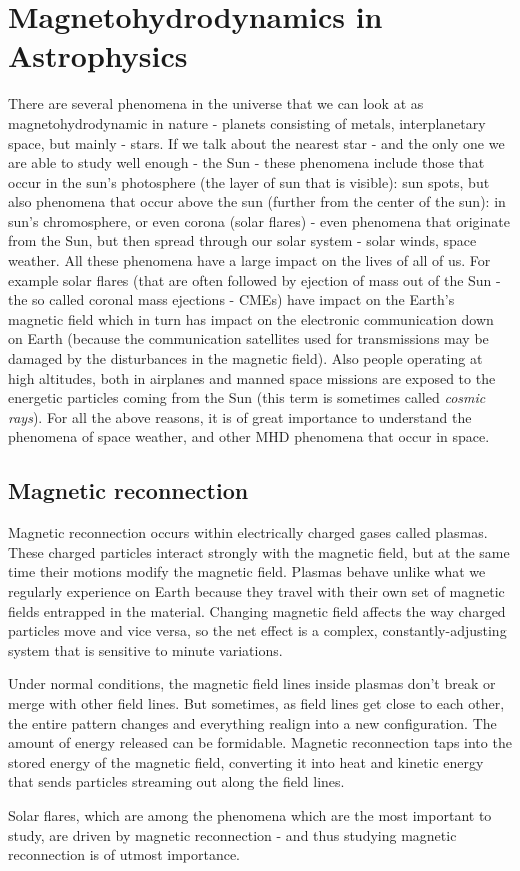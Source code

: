 \section{Magnetohydrodynamics in Astrophysics}
There are several phenomena in the universe that we can look at as magnetohydrodynamic in nature - planets consisting of metals, interplanetary space, but mainly - stars. If we talk about the nearest star - and the only one we are able to study well enough - the Sun - these phenomena include those that occur in the sun's photosphere (the layer of sun that is visible): sun spots, but also phenomena that occur above the sun (further from the center of the sun): in sun's chromosphere, or even corona (solar flares) - even phenomena that originate from the Sun, but then spread through our solar system - solar winds, space weather. All these phenomena have a large impact on the lives of all of us. For example solar flares (that are often followed by ejection of mass out of the Sun - the so called coronal mass ejections - CMEs) have impact on the Earth's magnetic field which in turn has impact on the electronic communication down on Earth (because the communication satellites used for transmissions may be damaged by the disturbances in the magnetic field). Also people operating at high altitudes, both in airplanes and manned space missions are exposed to the energetic particles coming from the Sun (this term is sometimes called \textit{cosmic rays}). For all the above reasons, it is of great importance to understand the phenomena of space weather, and other MHD phenomena that occur in space.
\subsection{Magnetic reconnection}

Magnetic reconnection occurs within electrically charged gases called plasmas. These charged particles interact strongly with the magnetic field, but at the same time their motions modify the magnetic field. Plasmas behave unlike what we regularly experience on Earth because they travel with their own set of magnetic fields entrapped in the material. Changing magnetic field affects the way charged particles move and vice versa, so the net effect is a complex, constantly-adjusting system that is sensitive to minute variations.

Under normal conditions, the magnetic field lines inside plasmas don't break or merge with other field lines. But sometimes, as field lines get close to each other, the entire pattern changes and everything realign into a new configuration. The amount of energy released can be formidable. Magnetic reconnection taps into the stored energy of the magnetic field, converting it into heat and kinetic energy that sends particles streaming out along the field lines.

Solar flares, which are among the phenomena which are the most important to study, are driven by magnetic reconnection - and thus studying magnetic reconnection is of utmost importance.